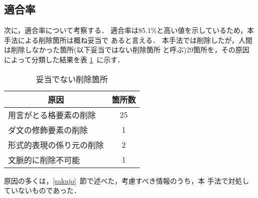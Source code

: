 \subsection{適合率} \label{kousatus_tekigou}
次に，適合率について考察する．
適合率は85.1\%と高い値を示しているため，本手法による削除箇所は概ね妥当で
あると言える．
本手法では削除したが，人間は削除しなかった箇所(以下妥当ではない削除箇所
と呼ぶ)29箇所を，その原因によって分類した結果を表
\ref{tab:tekigou_kasho}~に示す．
\begin{table}[b]
\begin{center}
\caption[原因2]{妥当でない削除箇所} \label{tab:tekigou_kasho}
\begin{tabular}{|l|c|}
\hline
\multicolumn{1}{|c|}{原因}&箇所数\\
\hline \hline
用言がとる格要素の削除       & 25 \\ \hline
ダ文の修飾要素の削除     &  1 \\ \hline
形式的表現の係り元の削除 &  2 \\ \hline
文脈的に削除不可能       &  1 \\ \hline
\end{tabular}
\end{center}
\end{table}
原因の多くは，\ref{sakujo}~節で述べた，考慮すべき情報のうち，本
手法で対処していないものであった．
